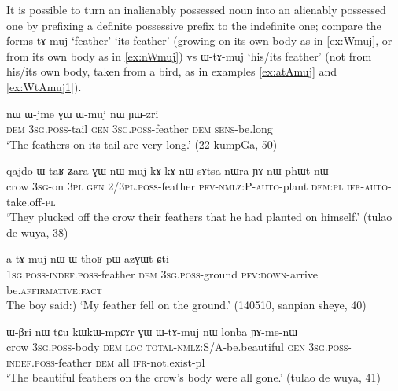 \documentclass[oldfontcommands,oneside,a4paper,11pt]{article}
\newcommand{\ipa}[1]{{\phon #1}} %
\newcommand{\rdp}{\textasciitlide{}}
\begin{document}
It is possible to turn an inalienably possessed noun into an alienably possessed one by prefixing a definite possessive prefix to the indefinite one; compare the forms \ipa{tɤ-muj} `feather' `its feather' (growing on its own body as in \ref{ex:Wmuj}, or from its own body as in \ref{ex:nWmuj}) vs \ipa{ɯ-tɤ-muj} `his/its feather' (not from his/its own body, taken from a bird, as in examples \ref{ex:atAmuj} and \ref{ex:WtAmuj1}).


\begin{exe}
\ex \label{ex:Wmuj}
\gll 
\ipa{nɯ} 	\ipa{ɯ-jme} 	\ipa{ɣɯ} 	\ipa{ɯ-muj} 	\ipa{nɯ} 	\ipa{ɲɯ-zri} \\
\textsc{dem} \textsc{3sg.poss}-tail \textsc{gen} \textsc{3sg.poss}-feather \textsc{dem}  \textsc{sens}-be.long \\
\glt `The feathers on its tail are very long.' (22 kumpGa, 50)
\end{exe}

\begin{exe}
\ex \label{ex:nWmuj}
\gll 
\ipa{qajdo} 	\ipa{ɯ-taʁ} 	\ipa{ʑara} 	\ipa{ɣɯ} 	\ipa{nɯ-muj} 	\ipa{kɤ-kɤ-nɯ-sɤtsa} 	\ipa{nɯra} 	\ipa{ɲɤ-nɯ-phɯt-nɯ} \\
crow \textsc{3sg}-on \textsc{3pl} \textsc{gen} \textsc{2/3pl.poss}-feather \textsc{pfv-nmlz:P-auto}-plant \textsc{dem:pl} \textsc{ifr-auto}-take.off-\textsc{pl} \\
\glt `They plucked off the crow their feathers that he had planted on himself.' (tulao de wuya, 38)
\end{exe}

\begin{exe}
\ex \label{ex:atAmuj}
\gll 
\ipa{a-tɤ-muj} 	\ipa{nɯ} 	\ipa{ɯ-thoʁ} 	\ipa{pɯ-azɣɯt} 	\ipa{ɕti} \\
\textsc{1sg.poss-indef.poss}-feather \textsc{dem}  \textsc{3sg.poss}-ground \textsc{pfv:down}-arrive be.\textsc{affirmative:fact} \\
\glt The boy said:) `My feather fell on the ground.' (140510, sanpian sheye, 40)
\end{exe}

\begin{exe}
\ex \label{ex:WtAmuj1}
\gll \ipa{qajdo}  	\ipa{ɯ-βri}  	\ipa{nɯ} \ipa{tɕu}  	\ipa{kɯ\rdp{}kɯ-mpɕɤr}  	\ipa{ɣɯ}  	\ipa{ɯ-tɤ-muj}  	\ipa{nɯ}  	 	\ipa{lonba}  	\ipa{ɲɤ-me-nɯ}  \\
crow \textsc{3sg.poss}-body \textsc{dem} \textsc{loc} \textsc{total\rdp{}-nmlz}:S/A-be.beautiful \textsc{gen} \textsc{3sg.poss-indef.poss}-feather  \textsc{dem} all \textsc{ifr}-not.exist-pl \\
\glt `The beautiful feathers on the crow's body were all gone.' (tulao de wuya, 41)
\end{exe}
\end{document}
